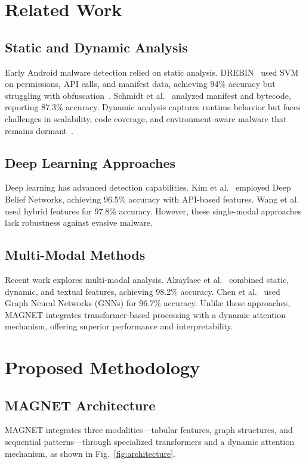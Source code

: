 \documentclass[10pt,conference]{IEEEtran}
\begin{document}
\section{Related Work}\label{sec:related_work}
\subsection{Static and Dynamic Analysis}
Early Android malware detection relied on static analysis. DREBIN~\cite{DrebinPaper} used SVM on permissions, API calls, and manifest data, achieving 94\% accuracy but struggling with obfuscation~\cite{StaticAnalysisLimitations2023}. Schmidt et al.~\cite{StaticAnalysisFramework} analyzed manifest and bytecode, reporting 87.3\% accuracy. Dynamic analysis captures runtime behavior but faces challenges in scalability, code coverage, and environment-aware malware that remains dormant~\cite{DynamicAnalysisConstraints2023}.

\subsection{Deep Learning Approaches}
Deep learning has advanced detection capabilities. Kim et al.~\cite{DeepDroid} employed Deep Belief Networks, achieving 96.5\% accuracy with API-based features. Wang et al.~\cite{DroidDeepLearner} used hybrid features for 97.8\% accuracy. However, these single-modal approaches lack robustness against evasive malware.

\subsection{Multi-Modal Methods}
Recent work explores multi-modal analysis. Alzaylaee et al.~\cite{DroidMultiModal} combined static, dynamic, and textual features, achieving 98.2\% accuracy. Chen et al.~\cite{MultiModalGraphML} used Graph Neural Networks (GNNs) for 96.7\% accuracy. Unlike these approaches, MAGNET integrates transformer-based processing with a dynamic attention mechanism, offering superior performance and interpretability.

\section{Proposed Methodology}\label{sec:methodology}
\subsection{MAGNET Architecture}
MAGNET integrates three modalities—tabular features, graph structures, and sequential patterns—through specialized transformers and a dynamic attention mechanism, as shown in Fig.~\ref{fig:architecture}.
\end{document}
